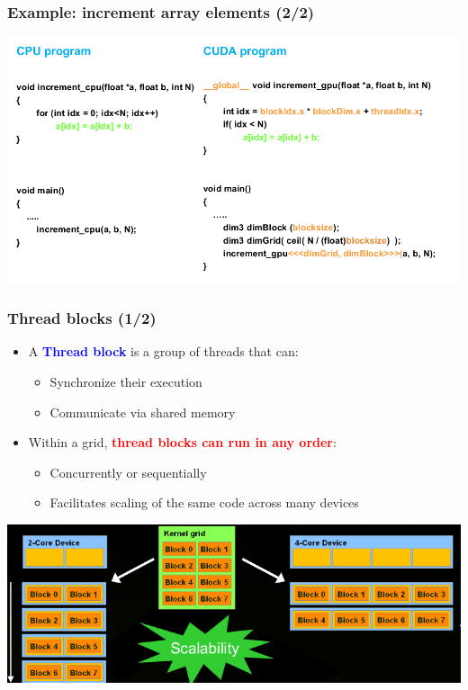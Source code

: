 \begin{frame}[fragile]
\frametitle{Example: increment array elements (2/2)}

\begin{center}
\includegraphics[scale=0.5]{images/8.png}
\end{center}
\end{frame}
\begin{frame}[fragile]
\frametitle{Thread blocks (1/2)}

\begin{itemize}
\item A \textcolor{blue}{\bf Thread block} is a group of threads that can:
\begin{itemize}
\item Synchronize their execution
\item Communicate via shared memory
\end{itemize}
\item Within a grid, \textcolor{red}{\bf thread blocks can run in any order}:
\begin{itemize}
\item  Concurrently or sequentially
\item  Facilitates scaling of the same code across many devices
\end{itemize}
\end{itemize}

\begin{center}
\includegraphics[scale=0.5]{images/11.png}
\end{center}
\end{frame}
